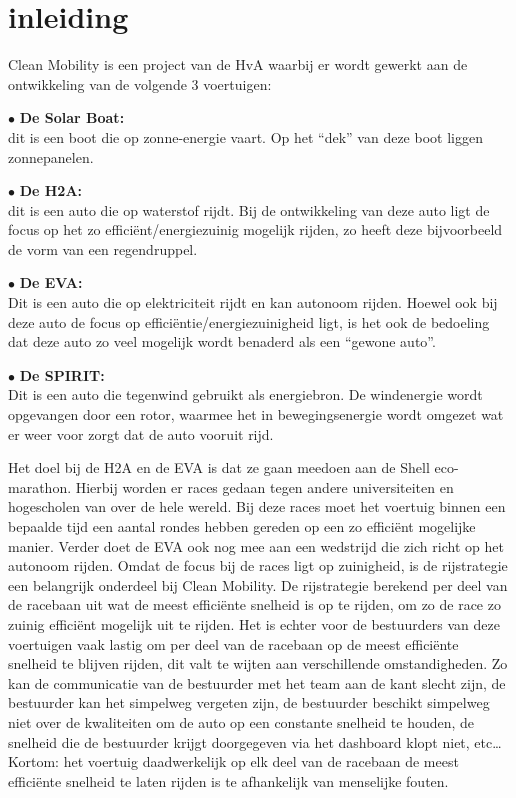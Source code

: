 \documentclass[a4paper, 11pt]{article} %
\begin{document}
\section{inleiding}
Clean Mobility is een project van de HvA waarbij er wordt gewerkt aan de ontwikkeling van de volgende 3 voertuigen:
\begin{description}
	\item$\bullet${ \textbf{De Solar Boat:}}\\
		dit is een boot die op zonne-energie vaart. Op het “dek” van deze boot liggen zonnepanelen.
	\item$\bullet${ \textbf{De H2A:}}\\
		dit is een auto die op waterstof rijdt. Bij de ontwikkeling van deze auto ligt de focus op het zo efficiënt/energiezuinig mogelijk rijden, zo heeft deze bijvoorbeeld de vorm van een regendruppel.
	\item$\bullet${ \textbf{De EVA:}}\\
		Dit is een auto die op elektriciteit rijdt en kan autonoom rijden. Hoewel ook bij deze auto de focus op efficiëntie/energiezuinigheid ligt, is het ook de bedoeling dat deze auto zo veel mogelijk wordt benaderd als een “gewone auto”.
	\item$\bullet${ \textbf{De SPIRIT:}}\\
		Dit is een auto die tegenwind gebruikt als energiebron. De windenergie wordt opgevangen door een rotor, waarmee het in bewegingsenergie wordt omgezet wat er weer voor zorgt dat de auto vooruit rijd.
	
\end{description}
Het doel bij de H2A en de EVA is dat ze gaan meedoen aan de Shell eco-marathon. Hierbij worden er races gedaan tegen andere universiteiten en hogescholen van over de hele wereld. Bij deze races moet het voertuig binnen een bepaalde tijd een aantal rondes hebben gereden op een zo efficiënt mogelijke manier. Verder doet de EVA ook nog mee aan een wedstrijd die zich richt op het autonoom rijden.  Omdat de focus bij de races ligt op zuinigheid, is de rijstrategie een belangrijk onderdeel bij Clean Mobility. De rijstrategie berekend per deel van de racebaan uit wat de meest efficiënte snelheid is op te rijden, om zo de race zo zuinig efficiënt mogelijk uit te rijden. Het is echter voor de bestuurders van deze voertuigen vaak lastig om per deel van de racebaan op de meest efficiënte snelheid te blijven rijden, dit valt te wijten aan verschillende omstandigheden. Zo kan de communicatie van de bestuurder met het team aan de kant slecht zijn, de bestuurder kan het simpelweg vergeten zijn, de bestuurder beschikt simpelweg niet over de kwaliteiten om de auto op een constante snelheid te houden, de snelheid die de bestuurder krijgt doorgegeven via het dashboard klopt niet, etc… \\
Kortom: het voertuig daadwerkelijk op elk deel van de racebaan de meest efficiënte snelheid te laten rijden is te afhankelijk van menselijke fouten.
\end{document}
